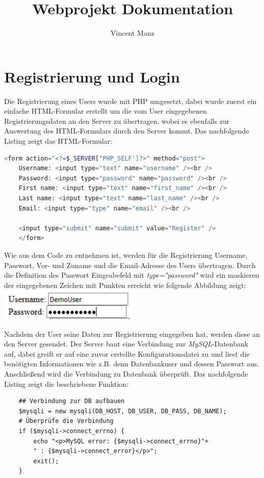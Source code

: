 \documentclass{article}
\begin{document}
	
	\title{Webprojekt Dokumentation}
	\author{Vincent Manz}
	
	\maketitle

	
	\section{Registrierung und Login}
	Die Registrierung eines Users wurde mit PHP umgesetzt, dabei wurde zuerst ein einfache HTML-Formular erstellt um die vom User eingegebenen Registrierungsdaten an den Server zu \"ubertragen, wobei es ebenfalls zur Auswertung des HTML-Formulars durch den Server kommt. 
	Das nachfolgende Listing zeigt das HTML-Formular:
	\begin{lstlisting}[language=PHP]
	<form action="<?=$_SERVER['PHP_SELF']?>" method="post">
	Username: <input type="text" name="username" /><br />
	Password: <input type="password" name="password" /><br />
	First name: <input type="text" name="first_name" /><br />
	Last name: <input type="text" name="last_name" /><br />
	Email: <input type="type" name="email" /><br />
	
	<input type="submit" name="submit" value="Register" />
	</form>
	\end{lstlisting}
	Wie aus dem Code zu entnehmen ist, werden f\"ur die Registrierung Username, Passwort, Vor- und Zuname und die Email-Adresse des Users \"ubertragen. Durch die Definition des Passwort Eingeabefeld mit \textit{type="password"} wird ein maskieren der eingegebenen Zeichen mit Punkten erreicht wie folgende Abbildung zeigt:
	\newline
	\includegraphics[width=0.5\textwidth]{abb01.png}
	
	Nachdem der User seine Daten zur Registrierung eingegeben hat, werden diese an den Server gesendet. Der Server baut eine Verbindung zur \textit{MySQL}-Datenbank auf, dabei greift er auf eine zuvor erstellte Konfigurationsdatei zu und liest die ben\"otigten Informationen wie z.B. denn Datenbankuser und dessen Passwort aus. Anschlie{\ss}end wird die Verbindung zu Datenbank \"uberpr\"uft. Das nachfolgende Listing zeigt die beschriebene Funktion:
	\begin{lstlisting}
	## Verbindung zur DB aufbauen
	$mysqli = new mysqli(DB_HOST, DB_USER, DB_PASS, DB_NAME);
	# Überprüfe die Verbindung
	if ($mysqli->connect_errno) {
		echo "<p>MySQL error: {$mysqli->connect_errno}"+
		" : {$mysqli->connect_error}</p>";
		exit();
	}
	\end{lstlisting}
	
\end{document}
